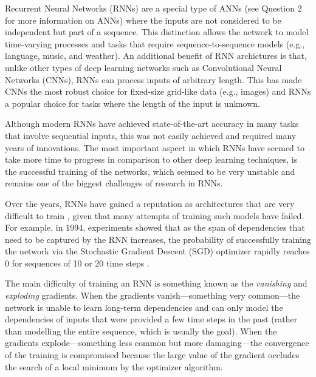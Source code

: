 





Recurrent Neural Networks (RNNs) are a special type of ANNs (see Question 2 for more information on ANNs) where the inputs are not considered to be independent but part of a sequence. This distinction allows the network to model time-varying processes and tasks that require sequence-to-sequence models (e.g., language, music, and weather). An additional benefit of RNN archictures is that, unlike other types of deep learning networks such as Convolutional Neural Networks (CNNs), RNNs can process inputs of arbitrary length. This has made CNNs the most robust choice for fixed-size grid-like data (e.g., images) and RNNs a popular choice for tasks where the length of the input is unknown. 

Although modern RNNs have achieved state-of-the-art accuracy in many tasks that involve sequential inputs, this was not easily achieved and required many years of innovations. The most important aspect in which RNNs have seemed to take more time to progress in comparison to other deep learning techniques, is the successful training of the networks, which seemed to be very unstable and remains one of the biggest challenges of research in RNNs.


Over the years, RNNs have gained a reputation as architectures that are very difficult to train \cite{pascanu2013difficulty}, given that many attempts of training such models have failed. For example, in 1994, experiments showed that as the span of dependencies that need to be captured by the RNN increases, the probability of successfully training the network via the Stochastic Gradient Descent (SGD) optimizer rapidly reaches 0 for sequences of 10 or 20 time steps \cite{bengio1994learning}. 

The main difficulty of training an RNN is something known as the \emph{vanishing} and \emph{exploding} gradients. When the gradients vanish---something very common---the network is unable to learn long-term dependencies and can only model the dependencies of inputs that were provided a few time steps in the past (rather than modelling the entire sequence, which is usually the goal). When the gradients explode---something less common but more damaging---the convergence of the training is compromised because the large value of the gradient occludes the search of a local minimum by the optimizer algorithm.


